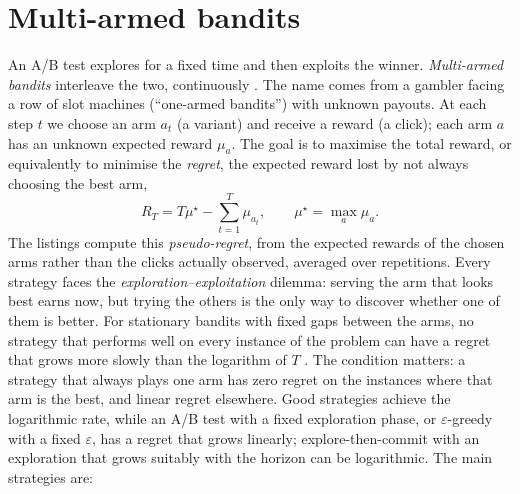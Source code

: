 \section{Multi-armed bandits\extsec}\label{sec:bandits}

An A/B test explores for a fixed time and then exploits the winner. \emph{Multi-armed bandits} interleave the two, continuously
\citep{lattimore2020bandit}. The name comes from a gambler facing a row of slot machines (``one-armed bandits'') with unknown payouts. At each
step $t$ we choose an arm $a_t$ (a variant) and receive a reward (a click); each arm $a$ has an unknown expected reward $\mu_a$. The goal is to
maximise the total reward, or equivalently to minimise the \emph{regret}, the expected reward lost by not always choosing the best arm,
\begin{equation}
  R_T=T\mu^\star-\sum_{t=1}^{T}\mu_{a_t},\qquad \mu^\star=\max_a\mu_a .
\end{equation}
The listings compute this \emph{pseudo-regret}, from the expected rewards of the chosen arms rather than the clicks
actually observed, averaged over repetitions.
Every strategy faces the \emph{exploration--exploitation} dilemma: serving the arm that looks best earns now, but trying the others is the
only way to discover whether one of them is better. For stationary bandits with fixed gaps
between the arms, no strategy that performs well on every instance of the problem can have a regret that grows more slowly
than the logarithm of $T$ \citep{lai1985asymptotically}. The condition matters: a strategy that always plays one arm has zero regret on the instances where that arm
is the best, and linear regret elsewhere. Good strategies achieve the logarithmic rate, while an A/B test with a fixed
exploration phase, or $\varepsilon$-greedy with a fixed $\varepsilon$, has a regret that grows linearly; explore-then-commit
with an exploration that grows suitably with the horizon can be logarithmic. The main strategies are:
